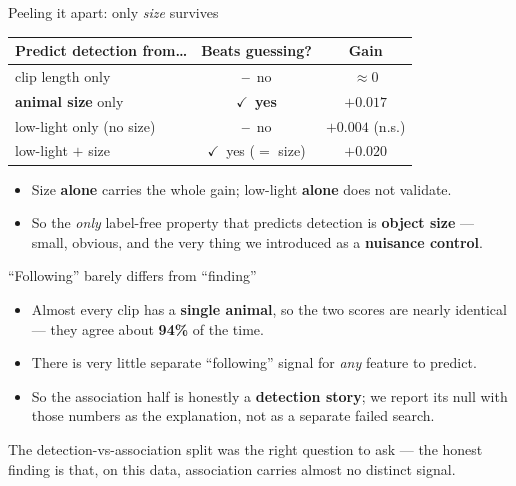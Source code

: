 \documentclass[aspectratio=169,11pt]{beamer}
\newcommand{\ck}{{\color{forest}$\checkmark$}}
\newcommand{\no}{{\color{burnt}\textbf{--}}}
\begin{document}
\begin{frame}{Peeling it apart: only \emph{size} survives}
  \centering
  \begin{table}
  \scriptsize
  \begin{tabular}{lcc}
    \toprule
    Predict detection from\dots & Beats guessing? & Gain \\
    \midrule
    clip length only          & \no\ no              & $\approx 0$ \\
    \textbf{animal size} only & \ck\ \textbf{yes}    & $+0.017$ \\
    low-light only (no size)  & \no\ no              & $+0.004$ (n.s.) \\
    low-light $+$ size        & \ck\ yes ($=$ size)  & $+0.020$ \\
    \bottomrule
  \end{tabular}
  \end{table}
  \vspace{0.4em}
  \begin{itemize}\footnotesize
    \item Size \textbf{alone} carries the whole gain; low-light \textbf{alone} does not validate.
    \item So the \emph{only} label-free property that predicts detection is \textbf{object size} --- small,
          obvious, and the very thing we introduced as a \textbf{nuisance control}.
  \end{itemize}
\end{frame}

\begin{frame}{``Following'' barely differs from ``finding''}
  \begin{itemize}
    \item Almost every clip has a \textbf{single animal}, so the two scores are nearly identical
          --- they agree about \textbf{94\%} of the time.
    \item There is very little separate ``following'' signal for \emph{any} feature to predict.
    \item So the association half is honestly a \textbf{detection story}; we report its null with those
          numbers as the explanation, not as a separate failed search.
  \end{itemize}
  \vspace{0.4em}
  \begin{block}{}
    \centering\footnotesize The detection-vs-association split was the right question to ask ---
    the honest finding is that, on this data, association carries almost no distinct signal.
  \end{block}
\end{frame}
\end{document}
